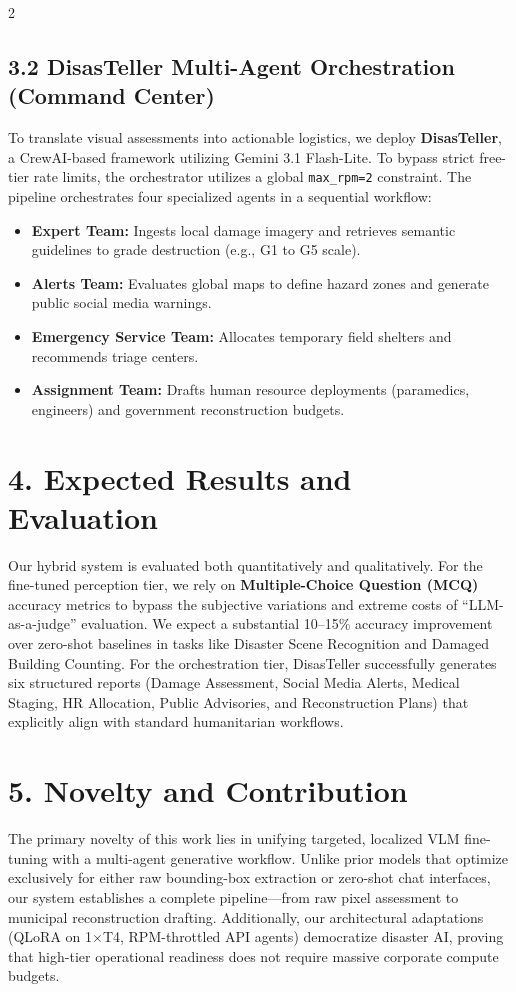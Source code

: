\documentclass[11pt]{article}
\begin{document}
\begin{multicols}{2}
\subsection*{3.2 DisasTeller Multi-Agent Orchestration (Command Center)}
To translate visual assessments into actionable logistics, we deploy \textbf{DisasTeller}, a CrewAI-based framework utilizing Gemini 3.1 Flash-Lite. To bypass strict free-tier rate limits, the orchestrator utilizes a global \texttt{max\_rpm=2} constraint. The pipeline orchestrates four specialized agents in a sequential workflow:
\begin{itemize}
    \item \textbf{Expert Team:} Ingests local damage imagery and retrieves semantic guidelines to grade destruction (e.g., G1 to G5 scale).
    \item \textbf{Alerts Team:} Evaluates global maps to define hazard zones and generate public social media warnings.
    \item \textbf{Emergency Service Team:} Allocates temporary field shelters and recommends triage centers.
    \item \textbf{Assignment Team:} Drafts human resource deployments (paramedics, engineers) and government reconstruction budgets.
\end{itemize}

\section*{4. Expected Results and Evaluation}
Our hybrid system is evaluated both quantitatively and qualitatively. For the fine-tuned perception tier, we rely on \textbf{Multiple-Choice Question (MCQ)} accuracy metrics to bypass the subjective variations and extreme costs of ``LLM-as-a-judge'' evaluation. We expect a substantial 10--15\% accuracy improvement over zero-shot baselines in tasks like Disaster Scene Recognition and Damaged Building Counting. For the orchestration tier, DisasTeller successfully generates six structured reports (Damage Assessment, Social Media Alerts, Medical Staging, HR Allocation, Public Advisories, and Reconstruction Plans) that explicitly align with standard humanitarian workflows.

\section*{5. Novelty and Contribution}
The primary novelty of this work lies in unifying targeted, localized VLM fine-tuning with a multi-agent generative workflow. Unlike prior models that optimize exclusively for either raw bounding-box extraction or zero-shot chat interfaces, our system establishes a complete pipeline—from raw pixel assessment to municipal reconstruction drafting. Additionally, our architectural adaptations (QLoRA on 1$\times$T4, RPM-throttled API agents) democratize disaster AI, proving that high-tier operational readiness does not require massive corporate compute budgets.


\end{multicols}
\end{document}
